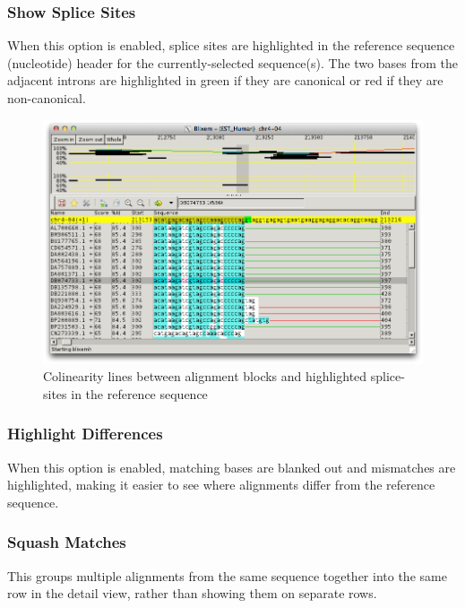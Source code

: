 \documentclass[letterpaper]{article}
\begin{document}
{\color[rgb]{0.30980393,0.5058824,0.7411765}\subsubsection[Show Splice Sites]{Show Splice Sites}}
\hypertarget{RefHeading2341056909880}{}
When this option is enabled, splice sites are highlighted in the reference sequence (nucleotide) header for the currently-selected sequence(s). The two bases from the adjacent introns are highlighted in green if they are canonical or red if they are non-canonical.

\begin{figure}
\centering
\color[rgb]{0.30980393,0.5058824,0.7411765}
\includegraphics[width=\textwidth]{img_view_colinearity.png}
\caption{Colinearity lines between alignment blocks and highlighted splice-sites in the reference sequence}
\end{figure}

\bigskip

{\color[rgb]{0.30980393,0.5058824,0.7411765}\subsubsection[Highlight Differences]{Highlight Differences}}
\hypertarget{RefHeading2361056909880}{}
When this option is enabled, matching bases are blanked out and mismatches are highlighted, making it easier to see where alignments differ from the reference sequence.

\bigskip

{\color[rgb]{0.30980393,0.5058824,0.7411765}\subsubsection[Squash Matches ]{Squash Matches }}
\hypertarget{RefHeading2381056909880}{}
This groups multiple alignments from the same sequence together into the same row in the detail view, rather than showing them on separate rows.
\end{document}
